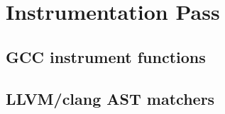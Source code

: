 \section{Instrumentation Pass}
\label{sec:implementation:instrumentation}


\subsection{GCC instrument functions}
\subsection{LLVM/clang AST matchers}
